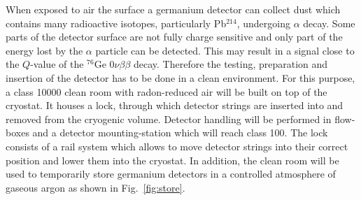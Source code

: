 When exposed to air the surface a germanium detector can collect dust which contains many radioactive isotopes, particularly Pb$^{214}$, undergoing $\alpha$ decay. Some parts of the detector surface are not fully charge sensitive and only part of the energy lost by the $\alpha$ particle can be detected. This may result in a signal close to the $Q$-value of the $^{76}$Ge $0\nu\beta\beta$ decay. Therefore the testing, preparation and insertion of the detector has to be done in a clean environment. For this purpose, a class 10000 clean room with radon-reduced air will be built on top of the cryostat. It houses a lock, through which detector strings are inserted into and removed from the cryogenic volume. Detector handling will be performed in flow-boxes and a detector mounting-station which will reach class 100.  The lock consists of a rail system which allows to move detector strings into their correct position and lower them into the cryostat. In addition, the clean room will be used to temporarily store germanium detectors in a controlled atmosphere of gaseous argon as shown in Fig.~\ref{fig:store}.

